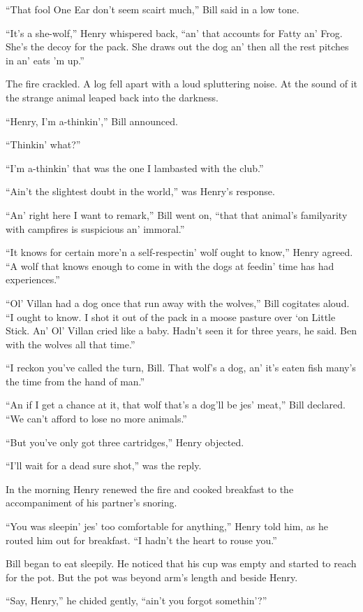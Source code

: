 “That fool One Ear don’t seem scairt much,” Bill said in a low tone.

“It’s a she-wolf,” Henry whispered back, “an’ that accounts for Fatty
an’ Frog. She’s the decoy for the pack. She draws out the dog an’ then
all the rest pitches in an’ eats ’m up.”

The fire crackled. A log fell apart with a loud spluttering noise. At
the sound of it the strange animal leaped back into the darkness.

“Henry, I’m a-thinkin’,” Bill announced.

“Thinkin’ what?”

“I’m a-thinkin’ that was the one I lambasted with the club.”

“Ain’t the slightest doubt in the world,” was Henry’s response.

“An’ right here I want to remark,” Bill went on, “that that animal’s
familyarity with campfires is suspicious an’ immoral.”

“It knows for certain more’n a self-respectin’ wolf ought to know,”
Henry agreed. “A wolf that knows enough to come in with the dogs at
feedin’ time has had experiences.”

“Ol’ Villan had a dog once that run away with the wolves,” Bill
cogitates aloud. “I ought to know. I shot it out of the pack in a moose
pasture over ‘on Little Stick. An’ Ol’ Villan cried like a baby. Hadn’t
seen it for three years, he said. Ben with the wolves all that time.”

“I reckon you’ve called the turn, Bill. That wolf’s a dog, an’ it’s
eaten fish many’s the time from the hand of man.”

“An if I get a chance at it, that wolf that’s a dog’ll be jes’ meat,”
Bill declared. “We can’t afford to lose no more animals.”

“But you’ve only got three cartridges,” Henry objected.

“I’ll wait for a dead sure shot,” was the reply.

In the morning Henry renewed the fire and cooked breakfast to the
accompaniment of his partner’s snoring.

“You was sleepin’ jes’ too comfortable for anything,” Henry told him,
as he routed him out for breakfast. “I hadn’t the heart to rouse you.”

Bill began to eat sleepily. He noticed that his cup was empty and
started to reach for the pot. But the pot was beyond arm’s length and
beside Henry.

“Say, Henry,” he chided gently, “ain’t you forgot somethin’?”

